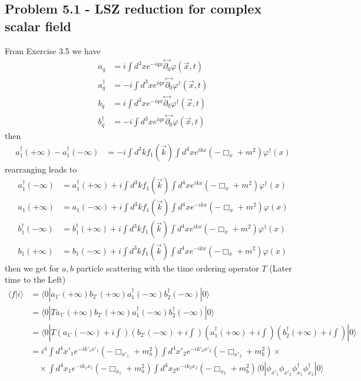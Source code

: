 \documentclass[../main.tex]{subfiles}
\begin{document}
\subsection{Problem 5.1 - LSZ reduction for complex scalar field}
From Exercise 3.5 we have
\begin{align}
a_q&=i\int d^3x e^{-iqx}\stackrel{\leftrightarrow}{\partial_0}\varphi(\vec{x},t)\\
a_q^\dagger&=-i\int d^3x e^{iqx}\stackrel{\leftrightarrow}{\partial_0}\varphi^\dagger(\vec{x},t)\\
b_q&=i\int d^3x e^{-iqx}\stackrel{\leftrightarrow}{\partial_0}\varphi^\dagger(\vec{x},t)\\
b_q^\dagger&=-i\int d^3x e^{iqx}\stackrel{\leftrightarrow}{\partial_0}\varphi(\vec{x},t)
\end{align}
then
\begin{align}
a^\dagger_1(+\infty)-a^\dagger_1(-\infty)
&=-i\int d^3k f_1(\vec{k})\int d^4x e^{ikx}(-\Box_x+m^2)\varphi^\dagger(x)
\end{align}
rearranging leads to
\begin{align}
a^\dagger_1(-\infty)&=a^\dagger_1(+\infty)+i\int d^3k f_1(\vec{k})\int d^4x e^{ikx}(-\Box_x+m^2)\varphi^\dagger(x)\\
a_1(+\infty)&=a_1(-\infty)+i\int d^3k f_1(\vec{k})\int d^4x e^{-ikx}(-\Box_x+m^2)\varphi(x)\\
b^\dagger_1(-\infty)&=b^\dagger_1(+\infty)+i\int d^3k f_1(\vec{k})\int d^4x e^{ikx}(-\Box_x+m^2)\varphi^\dagger(x)\\
b_1(+\infty)&=b_1(-\infty)+i\int d^3k f_1(\vec{k})\int d^4x e^{-ikx}(-\Box_x+m^2)\varphi(x)
\end{align}
then we get for $a,b$ particle scattering with the time ordering operator $T$ (Later time to the Left)
\begin{align}
\langle f|i\rangle
&=\langle 0|a_{1'}(+\infty)b_{2'}(+\infty)a^\dagger_1(-\infty)b^\dagger_2(-\infty)|0\rangle\\
&=\langle 0|Ta_{1'}(+\infty)b_{2'}(+\infty)a^\dagger_1(-\infty)b^\dagger_2(-\infty)|0\rangle\\
&=\langle 0|T(a_{1'}(-\infty)+i\int)(b_{2'}(-\infty)+i\int)(a^\dagger_{1}(+\infty)+i\int)(b^\dagger_{2}(+\infty)+i\int)|0\rangle\\
&=i^4
\int d^4x'_1e^{-ik'_1x'_1}(-\Box_{x'_1}+m_a^2)
\int d^4x'_2e^{-ik'_2x'_2}(-\Box_{x'_2}+m_b^2)\times\\
&\quad\times
\int d^4x_1e^{-ik_1x_1}(-\Box_{x_1}+m_a^2)
\int d^4x_2e^{-ik_2x_2}(-\Box_{x_2}+m_b^2)\langle0|\phi_{x'_1}\phi_{x'_2}\phi^\dagger_{x_1}\phi^\dagger_{x_2}|0\rangle
\end{align}
\end{document}
